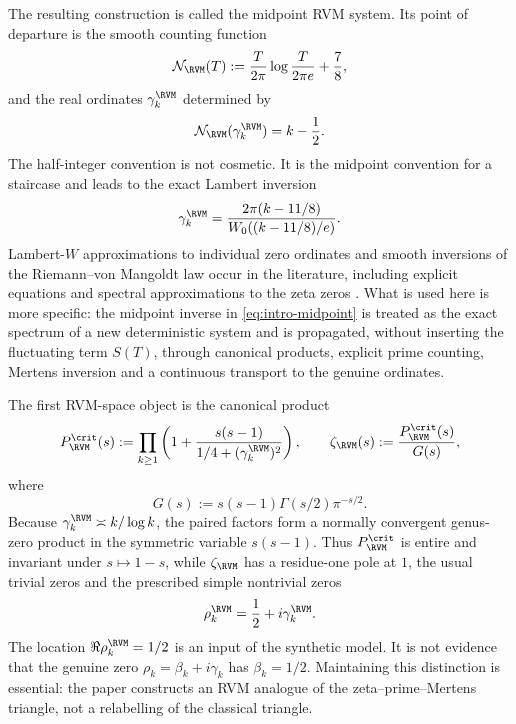 The resulting construction is called the midpoint RVM system.  Its point of
departure is the smooth counting function
\begin{equation}
 \mathcal N_{\RVM}(T)
 :=\frac{T}{2\pi}\log\frac{T}{2\pi e}+\frac78,
 \label{eq:intro-clock}
\end{equation}
and the real ordinates $\gamma_k^{\RVM}$ determined by
\begin{equation}
 \mathcal N_{\RVM}(\gamma_k^{\RVM})=k-\frac12.
 \label{eq:intro-midpoint}
\end{equation}
The half-integer convention is not cosmetic.  It is the midpoint convention
for a staircase and leads to the exact Lambert inversion
\begin{equation}
 \gamma_k^{\RVM}
 =\frac{2\pi(k-11/8)}{W_0((k-11/8)/e)}.
 \label{eq:intro-lambert}
\end{equation}
Lambert-$W$ approximations to individual zero ordinates and smooth inversions
of the Riemann--von Mangoldt law occur in the literature, including explicit
equations and spectral approximations to the zeta zeros
\cite{DLMF-W,FrancaLeClair2014}.  What is used here is more specific: the
midpoint inverse in \eqref{eq:intro-midpoint} is treated as the exact spectrum
of a new deterministic system and is propagated, without inserting the
fluctuating term $S(T)$, through canonical products, explicit prime counting,
Mertens inversion and a continuous transport to the genuine ordinates.

The first RVM-space object is the canonical product
\begin{equation}
 P_{\RVM}^{\crit}(s)
 :=\prod_{k\ge1}
 \left(1+\frac{s(s-1)}{1/4+(\gamma_k^{\RVM})^2}\right),
 \qquad
 \zeta_{\RVM}(s):=\frac{P_{\RVM}^{\crit}(s)}{G(s)},
 \label{eq:intro-zeta-rvm}
\end{equation}
where
\begin{equation}
 G(s):=s(s-1)\Gamma(s/2)\pi^{-s/2}.
\end{equation}
Because $\gamma_k^{\RVM}\asymp k/\log k$, the paired factors form a normally
convergent genus-zero product in the symmetric variable $s(s-1)$.  Thus
$P_{\RVM}^{\crit}$ is entire and invariant under $s\mapsto1-s$, while
$\zeta_{\RVM}$ has a residue-one pole at $1$, the usual trivial zeros and the
prescribed simple nontrivial zeros
\begin{equation}
 \rho_k^{\RVM}=\frac12+i\gamma_k^{\RVM}.
\end{equation}
The location $\Re\rho_k^{\RVM}=1/2$ is an input of the synthetic model.  It is
not evidence that the genuine zero $\rho_k=\beta_k+i\gamma_k$ has
$\beta_k=1/2$.  Maintaining this distinction is essential: the paper constructs
an RVM analogue of the zeta--prime--Mertens triangle, not a relabelling of the
classical triangle.

